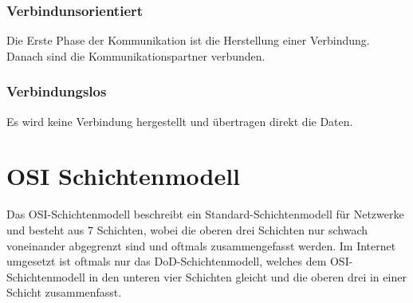 \documentclass[a4paper, 11pt, accentcolor = tud3b]{tudreport}
\begin{document}
            \subsection{Verbindunsorientiert}
                Die Erste Phase der Kommunikation ist die Herstellung einer Verbindung. Danach sind die Kommunikationspartner verbunden.

            \subsection{Verbindungslos}
                Es wird keine Verbindung hergestellt und übertragen direkt die Daten.

    \chapter{OSI Schichtenmodell}
        Das OSI-Schichtenmodell beschreibt ein Standard-Schichtenmodell für Netzwerke und besteht aus 7 Schichten, wobei die oberen drei Schichten nur schwach voneinander abgegrenzt sind und oftmals zusammengefasst werden. Im Internet umgesetzt ist oftmals nur das DoD-Schichtenmodell, welches dem OSI-Schichtenmodell in den unteren vier Schichten gleicht und die oberen drei in einer Schicht zusammenfasst.
        
\end{document}
